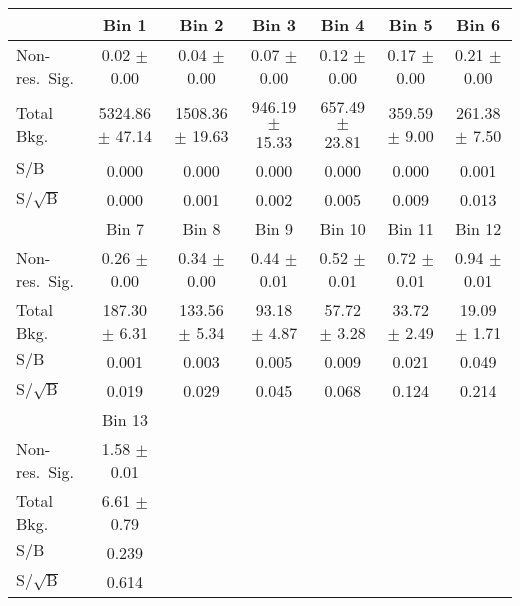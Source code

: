 \begin{tabular}{lcccccc}
  \toprule
  & Bin 1 & Bin 2 & Bin 3 & Bin 4 & Bin 5 & Bin 6 \\
  \midrule
  Non-res.\ Sig. & 0.02 $\pm$ 0.00 & 0.04 $\pm$ 0.00 & 0.07 $\pm$ 0.00 & 0.12 $\pm$ 0.00 & 0.17 $\pm$ 0.00 & 0.21 $\pm$ 0.00 \\
  Total Bkg. & 5324.86 $\pm$ 47.14 & 1508.36 $\pm$ 19.63 & 946.19 $\pm$ 15.33 & 657.49 $\pm$ 23.81 & 359.59 $\pm$ 9.00 & 261.38 $\pm$ 7.50 \\
  $\text{S} / \text{B}$ & 0.000 & 0.000 & 0.000 & 0.000 & 0.000 & 0.001 \\
  $\text{S} / \sqrt{\text{B}}$ & 0.000 & 0.001 & 0.002 & 0.005 & 0.009 & 0.013 \\

  \midrule
  & Bin 7 & Bin 8 & Bin 9 & Bin 10 & Bin 11 & Bin 12 \\
  \midrule
  Non-res.\ Sig. & 0.26 $\pm$ 0.00 & 0.34 $\pm$ 0.00 & 0.44 $\pm$ 0.01 & 0.52 $\pm$ 0.01 & 0.72 $\pm$ 0.01 & 0.94 $\pm$ 0.01 \\
  Total Bkg. & 187.30 $\pm$ 6.31 & 133.56 $\pm$ 5.34 & 93.18 $\pm$ 4.87 & 57.72 $\pm$ 3.28 & 33.72 $\pm$ 2.49 & 19.09 $\pm$ 1.71 \\
  $\text{S} / \text{B}$ & 0.001   & 0.003   & 0.005   & 0.009   & 0.021   & 0.049 \\
  $\text{S} / \sqrt{\text{B}}$ & 0.019   & 0.029   & 0.045   & 0.068   & 0.124   & 0.214 \\

  \midrule
  & Bin 13 & & & & & \\
  \midrule
  Non-res.\ Sig. & 1.58 $\pm$ 0.01 &&&&&\\
  Total Bkg. & 6.61 $\pm$ 0.79 &&&&&\\
  $\text{S} / \text{B}$ & 0.239 &&&&&\\
  $\text{S} / \sqrt{\text{B}}$ &  0.614 &&&&&\\

  \bottomrule
\end{tabular}
